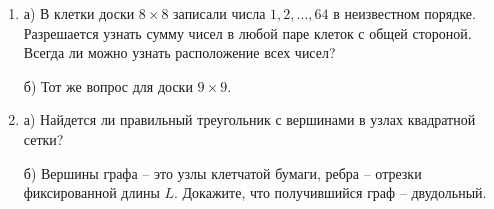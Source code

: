 \documentclass{article}
\begin{document}
\begin{enumerate}[label*=\protect\fbox{\arabic{enumi}}]
\item а) В клетки доски $8 \times 8$ записали числа $1, 2, . . . , 64$ в неизвестном порядке. Разрешается узнать сумму чисел в любой паре клеток с общей стороной. Всегда ли можно узнать расположение всех чисел?

б) Тот же вопрос для доски $9 \times 9$.

\item 
а) Найдется ли правильный треугольник с вершинами в узлах квадратной сетки?

б) Вершины графа – это узлы клетчатой бумаги, ребра – отрезки фиксированной длины $L$. Докажите, что получившийся граф – двудольный. 


\end{enumerate}
\end{document}
